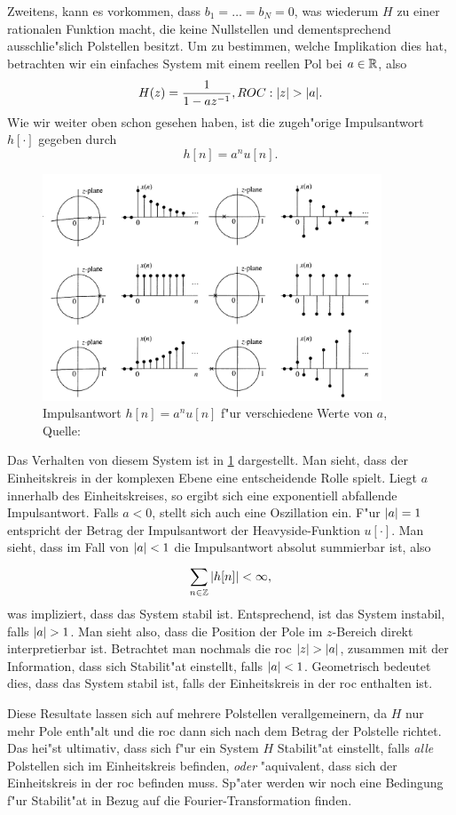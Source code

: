 Zweitens, kann es vorkommen, dass $b_1 = \dots = b_N = 0$, was wiederum $H$ zu einer rationalen Funktion macht, die keine Nullstellen und dementsprechend ausschlie"slich Polstellen besitzt.
Um zu bestimmen, welche Implikation dies hat, betrachten wir ein einfaches System mit einem reellen Pol bei $a \in \mathbb{R}$, also
\[
H(z) = \frac{1}{1 - a z^{-1}}, ROC: {\left| z \right|} > {\left| a \right|}.
\]
Wie wir weiter oben schon gesehen haben, ist die zugeh"orige Impulsantwort $h[\cdot]$ gegeben durch
\[
h[n] = a^n u[n].
\]
%
\begin{figure}
    \includegraphics[width=0.9\textwidth]{img/ztrafo/singlepole.png}
    \caption{Impulsantwort $h[n] = a^n u[n]$ f"ur verschiedene Werte von $a$, Quelle: \cite{proakis2013}}\label{fig:ztrafo:singlepole}
\end{figure}

Das Verhalten von diesem System ist in \cref{fig:ztrafo:singlepole} dargestellt.
Man sieht, dass der Einheitskreis in der komplexen Ebene eine entscheidende Rolle spielt.
Liegt $a$ innerhalb des Einheitskreises, so ergibt sich eine exponentiell abfallende Impulsantwort.
Falls $a < 0$, stellt sich auch eine Oszillation ein.
F"ur ${\left| a \right|} = 1$ entspricht der Betrag der Impulsantwort der Heavyside-Funktion $u[\cdot]$.
Man sieht, dass im Fall von ${\left| a \right|} < 1$ die Impulsantwort absolut summierbar ist, also
\[
{\sum\limits_{n \in \mathbb{Z}}^{}{{\left| h[n] \right|}}} < \infty,
\]
was impliziert, dass das System stabil ist.
Entsprechend, ist das System instabil, falls ${\left| a \right|} > 1$.
Man sieht also, dass die Position der Pole im $z$-Bereich direkt interpretierbar ist.
Betrachtet man nochmals die \gls{roc} ${\left| z \right|} > {\left| a \right|}$, zusammen mit der Information, dass sich Stabilit"at einstellt, falls ${\left| a \right|}<1$.
Geometrisch bedeutet dies, dass das System stabil ist, falls der Einheitskreis in der \gls{roc} enthalten ist.

Diese Resultate lassen sich auf mehrere Polstellen verallgemeinern, da $H$ nur mehr Pole enth"alt und die \gls{roc} dann sich nach dem Betrag der  Polstelle richtet.
Das hei"st ultimativ, dass sich f"ur ein System $H$ Stabilit"at einstellt, falls \emph{alle} Polstellen sich im Einheitskreis befinden, \emph{oder} "aquivalent, dass sich der Einheitskreis in der \gls{roc} befinden muss.
Sp"ater werden wir noch eine Bedingung f"ur Stabilit"at in Bezug auf die Fourier-Transformation finden.
